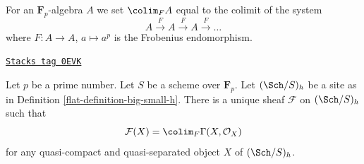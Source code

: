 For an $\mathbf{F}_p$-algebra $A$
we set $\colim_F A$ equal to the colimit of the system
$$
A \xrightarrow{F} A \xrightarrow{F} A \xrightarrow{F} \ldots
$$
where $F : A \to A$, $a \mapsto a^p$ is the Frobenius endomorphism.

\begin{lemma}
\label{flat-lemma-h-sheaf-colim-F}
\href{https://stacks.math.columbia.edu/tag/0EVK}{\texttt{Stacks tag 0EVK}}

Let $p$ be a prime number. Let $S$ be a scheme over $\mathbf{F}_p$.
Let $(\Sch/S)_h$ be a site as in Definition \ref{flat-definition-big-small-h}.
There is a unique sheaf $\mathcal{F}$ on $(\Sch/S)_h$ such that
$$
\mathcal{F}(X) = \colim_F \Gamma(X, \mathcal{O}_X)
$$
for any quasi-compact and quasi-separated object $X$ of $(\Sch/S)_h$.
\end{lemma}

